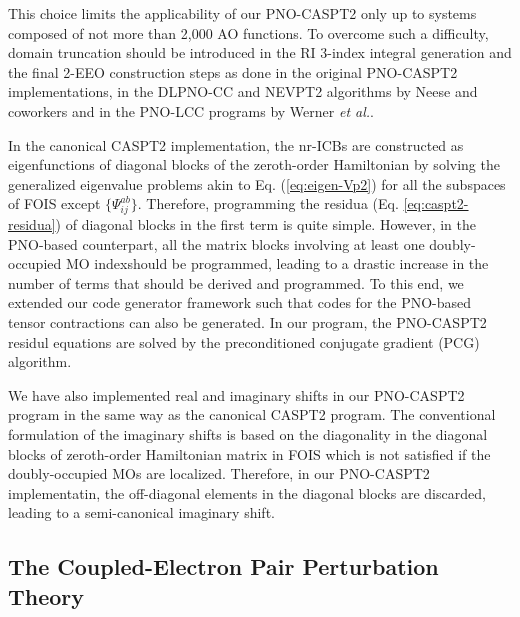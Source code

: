 \documentclass[aip,jcp,amsmath]{revtex4-1}
\begin{document}
%
This choice limits the applicability of our PNO-CASPT2 only up to systems composed of not more than 2,000 AO functions.
%
To overcome such a difficulty, domain truncation should be introduced in the RI 3-index integral generation and the final 2-EEO construction steps as done in the original PNO-CASPT2 implementations,\cite{:/content/aip/journal/jcp/145/12/10.1063/1.4963019,doi:10.1063/1.5097644} in the DLPNO-CC and NEVPT2 algorithms by Neese and coworkers\cite{riplingeran2013,riplingernatural2013,pinskisparse2015,riplingersparse2016,doi:10.1063/1.4981521,:/content/aip/journal/jcp/144/9/10.1063/1.4942769,dipayan2016,doi:10.1063/1.5027114} and in the PNO-LCC programs by Werner {\it et al.}.\cite{doi:10.1021/ct500725e,doi:10.1021/acs.jctc.5b00843,wernersdecay,doi:10.1021/acs.jctc.7b00554}

%
In the canonical CASPT2 implementation, the nr-ICBs are constructed as eigenfunctions of diagonal blocks of the zeroth-order Hamiltonian by solving the generalized eigenvalue problems akin to Eq. (\ref{eq:eigen-Vp2}) for all the subspaces of FOIS except $\{\Psi_{ij}^{ab}\}$.
%
Therefore, programming the residua (Eq. \ref{eq:caspt2-residua}) of diagonal blocks in the first term is quite simple.
%
However, in the PNO-based counterpart, all the matrix blocks involving at least one doubly-occupied MO indexshould be programmed, leading to a drastic increase in the number of terms that should be derived and programmed.
%
To this end, we extended our code generator framework\cite{femto,saitowmultireference2013,doi:10.1021/acs.jctc.5b00270} such that codes for the PNO-based tensor contractions can also be generated.
%
In our program, the PNO-CASPT2 residul equations are solved by the preconditioned conjugate gradient (PCG) algorithm.

%
We have also implemented real and imaginary shifts in our PNO-CASPT2 program in the same way as the canonical CASPT2 program.
%
The conventional formulation of the imaginary shifts is based on the diagonality in the diagonal blocks of zeroth-order Hamiltonian matrix in FOIS which is not satisfied if the doubly-occupied MOs are localized.
%
Therefore, in our PNO-CASPT2 implementatin, the off-diagonal elements in the diagonal blocks are discarded, leading to a semi-canonical imaginary shift.

\subsection{The Coupled-Electron Pair Perturbation Theory}\label{Subsec:cept2}
%
%
%
\end{document}
